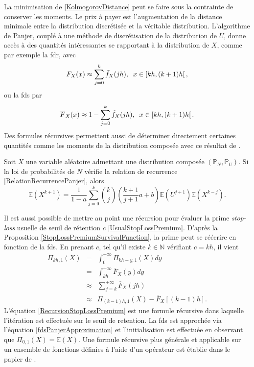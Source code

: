 La minimisation de \eqref{KolmogorovDistance} peut se faire sous la contrainte de conserver les moments. Le prix à payer est l\rq{}augmentation de la distance minimale entre la distribution discrétisée et la véritable distribution. L\rq{}algorithme de Panjer, couplé à une méthode de discrétisation de la distribution de $U$, donne accès à des quantités intéressantes se rapportant à la distribution de $X$, comme par exemple la \gls{fdr}, avec
\begin{equation}\label{fdrPanjerApproximation}
F_{X}(x)\approx\sum_{j=0}^{k}\tilde{f}_{X}(jh),\hspace{0.2cm}x\in\left[kh,(k+1)h\right[,
\end{equation}
ou la \gls{fds} par 
\begin{equation}\label{fdsPanjerApproximation}
\overline{F}_{X}(x)\approx1-\sum_{j=0}^{k}\tilde{f}_{X}(jh),\hspace{0.2cm}x\in\left[kh,(k+1)h\right[.
\end{equation}
Des formules récursives permettent aussi de déterminer directement certaines quantités comme les moments de la distribution composée avec ce résultat de \citet{DP86a}.
\begin{Prop}[De Pril (1986)]\label{RecursionMomentDePril}
Soit $X$ une variable aléatoire admettant une distribution composée $(\mathbb{P}_{N},\mathbb{P}_{U})$. Si la loi de probabilités de $N$ vérifie la relation de recurrence \eqref{RelationRecurrencePanjer}, alors 
\begin{equation}\label{MomentRecursionDePril}
\mathbb{E}\left(X^{k+1}\right)=\frac{1}{1-a}\sum_{j=0}^{k}\binom{k}{j}\left(\frac{k+1}{j+1}a+b\right)\mathbb{E}\left(U^{j+1}\right)\mathbb{E}\left(X^{k-j}\right).
\end{equation}
\end{Prop}
Il est aussi possible de mettre au point une récursion pour évaluer la prime \textit{stop-loss} usuelle de seuil de rétention $c$ \eqref{UsualStopLossPremium}. D\rq{}après la Proposition \ref{StopLossPremiumSurvivalFunction}, la prime peut se réécrire en fonction de la \gls{fds}. En prenant $c$, tel qu\rq{}il existe $k\in\mathbb{N}$ vérifiant $c=kh$, il vient 
\begin{eqnarray}
\Pi_{kh,1}(X)&=&\int_{0}^{+\infty}\Pi_{kh+y,1}(X)dy\nonumber\\
&=&\int_{kh}^{+\infty}\overline{F}_{X}(y)dy\nonumber\\
&\approx&\sum_{j=k}^{+\infty}\overline{F}_{X}(jh)\nonumber\\
&\approx&\Pi_{(k-1)h,1}(X)-\overline{F}_{X}\left[(k-1)h\right].\label{RecursionStopLossPremium}
\end{eqnarray}
L\rq{}équation \eqref{RecursionStopLossPremium} est une formule récursive dans laquelle l\rq{}itération est effectuée sur le seuil de retention. La \gls{fds} est approchée via l\rq{}équation \eqref{fdsPanjerApproximation} et l\rq{}initialisation est effectuée en observant que $\Pi_{0,1}(X)=\mathbb{E}(X)$. Une formule récursive plus générale et applicable sur un ensemble de fonctions définies à l\rq{}aide d\rq{}un opérateur est établie dans le papier de \citet{DhWiSu99}. 

